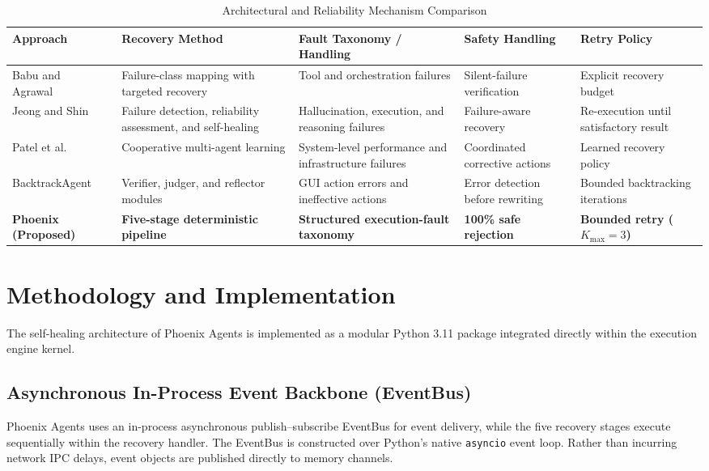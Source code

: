 \documentclass[conference]{IEEEtran}
\newcommand{\chg}[1]{{\color{blue}#1}}
\begin{document}
\begin{table}[t]
\centering
\caption{\chg{Architectural and Reliability Mechanism Comparison}}
\label{tab:system_comparison}
\footnotesize
\begin{tabularx}{\textwidth}{p{}p{}p{}p{}X}
\toprule
\textbf{\chg{Approach}} & \textbf{\chg{Recovery Method}} & \textbf{\chg{Fault Taxonomy / Handling}} & \textbf{\chg{Safety Handling}} & \textbf{\chg{Retry Policy}} \\
\midrule
Babu and Agrawal~\cite{babu2026} & Failure-class mapping with targeted recovery & Tool and orchestration failures & \chg{Silent-failure verification} & \chg{Explicit recovery budget} \\
Jeong and Shin~\cite{jeong2026} & Failure detection, reliability assessment, and self-healing & Hallucination, execution, and reasoning failures & \chg{Failure-aware recovery} & \chg{Re-execution until satisfactory result} \\
Patel et al.~\cite{patel2026b} & Cooperative multi-agent learning & System-level performance and infrastructure failures & \chg{Coordinated corrective actions} & \chg{Learned recovery policy} \\
BacktrackAgent~\cite{wu2025} & Verifier, judger, and reflector modules & GUI action errors and ineffective actions & \chg{Error detection before rewriting} & \chg{Bounded backtracking iterations} \\
\textbf{Phoenix (Proposed)} & \textbf{Five-stage deterministic pipeline} & \textbf{Structured execution-fault taxonomy} & \textbf{\chg{100\% safe rejection}} & \textbf{\chg{Bounded retry ($K_{\text{max}} = 3$)}} \\
\bottomrule
\end{tabularx}
\end{table}

\section{Methodology and Implementation}
The self-healing architecture of Phoenix Agents is implemented as a modular Python 3.11 package integrated directly within the execution engine kernel.

\subsection{Asynchronous In-Process Event Backbone (EventBus)}
Phoenix Agents uses an in-process asynchronous publish--subscribe EventBus for event delivery, while the five recovery stages execute sequentially within the recovery handler. The EventBus is constructed over Python's native \texttt{asyncio} event loop. Rather than incurring network IPC delays, event objects are published directly to memory channels.
\end{document}
